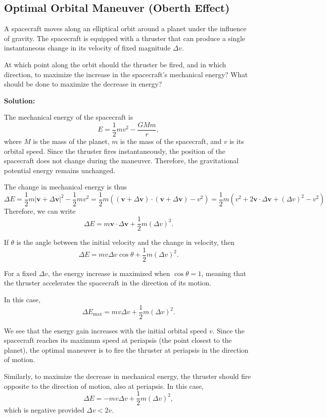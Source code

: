 \documentclass[12pt]{article}
\begin{document}
\subsection{Optimal Orbital Maneuver (Oberth Effect)}

A spacecraft moves along an elliptical orbit around a planet under
the influence of gravity. The spacecraft is equipped with a thruster
that can produce a single instantaneous change in its velocity of
fixed magnitude $\Delta v$.

At which point along the orbit should the thruster be fired, and
in which direction, to maximize the increase in the spacecraft's
mechanical energy? What should be done to maximize the decrease
in energy?

\textbf{Solution:}

The mechanical energy of the spacecraft is
\[
E=\frac{1}{2}mv^2-\frac{GMm}{r},
\]
where $M$ is the mass of the planet, $m$ is the mass of the spacecraft, and $v$ is its orbital speed. Since the thruster fires instantaneously, the position of the
spacecraft does not change during the maneuver. Therefore,
the gravitational potential energy remains unchanged.

The change in mechanical energy is thus
\[
\Delta E
=\frac{1}{2}m\left|\mathbf{v}+\Delta\mathbf{v}\right|^2
-\frac{1}{2}mv^2 = \frac{1}{2}m\left( (\mathbf{v}+\Delta\mathbf{v}) \cdot (\mathbf{v}+\Delta\mathbf{v}) - v^2\right) = \frac{1}{2}m (v^2 + 2\mathbf{v}\cdot\Delta\mathbf{v} + (\Delta v)^2 - v^2)
\]
Therefore, we can write
\[
\Delta E
=m\mathbf{v}\cdot\Delta\mathbf{v}
+\frac{1}{2}m(\Delta v)^2.
\]

If $\theta$ is the angle between the initial velocity and the
change in velocity, then
\[
\boxed{
\Delta E=mv\Delta v\cos\theta
+\frac{1}{2}m(\Delta v)^2.
}
\]

For a fixed $\Delta v$, the energy increase is maximized when
$\cos\theta=1$, meaning that the thruster accelerates the
spacecraft in the direction of its motion.

In this case,
\[
\Delta E_{\max}
=mv\Delta v+\frac{1}{2}m(\Delta v)^2.
\]

We see that the energy gain increases with the initial orbital
speed $v$. Since the spacecraft reaches its maximum speed at
periapsis (the point closest to the planet), the optimal maneuver
is to fire the thruster at periapsis in the direction of motion.

Similarly, to maximize the decrease in mechanical energy,
the thruster should fire opposite to the direction of motion,
also at periapsis. In this case,
\[
\Delta E=-mv\Delta v+\frac{1}{2}m(\Delta v)^2,
\]
which is negative provided $\Delta v<2v$.
\end{document}

